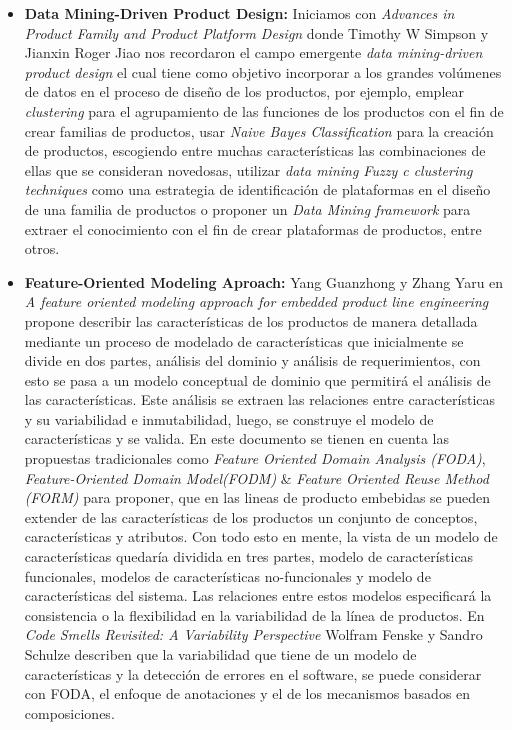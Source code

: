 \begin{itemize}
	\item{ \textbf{Data Mining-Driven Product Design:}}
	Iniciamos con \textit{Advances in Product Family and Product Platform Design}\cite{Simpson} donde Timothy W Simpson y Jianxin Roger Jiao nos recordaron el campo emergente \textit{data mining-driven product design} el cual tiene como objetivo incorporar a los grandes volúmenes de datos en el proceso de diseño de los productos, por ejemplo, emplear \textit{clustering} para el agrupamiento de las funciones de los productos con el fin de crear familias de productos, usar \textit{Naive Bayes Classification} para la creación de productos, escogiendo entre muchas características las combinaciones de ellas que se consideran  novedosas, utilizar \textit{data mining Fuzzy c clustering techniques} como una estrategia de identificación de plataformas en el diseño de una familia de productos o proponer un \textit{Data Mining framework} para extraer el conocimiento con el fin de crear plataformas de productos, entre otros. 
	\item{ \textbf{Feature-Oriented Modeling Aproach:}} 
	Yang Guanzhong y Zhang Yaru en \textit{A feature oriented modeling approach for embedded product line engineering}\cite{Yang2015a} propone describir las características de los productos de manera detallada mediante un proceso de modelado de características que inicialmente se divide en dos partes, análisis del dominio y análisis de requerimientos, con esto se pasa a un modelo conceptual de dominio que permitirá el análisis de las características. Este análisis se extraen las relaciones entre características y su variabilidad e inmutabilidad, luego, se construye el modelo de características y se valida. En este documento se tienen en cuenta las propuestas tradicionales como \textit{Feature Oriented Domain Analysis (FODA)}, \textit{Feature-Oriented Domain Model(FODM)} \& \textit{Feature  Oriented Reuse Method (FORM)} para proponer, que en las lineas de producto embebidas se pueden extender de las características de los productos un conjunto de conceptos, características y atributos. Con todo esto en mente, la vista de un modelo de características quedaría dividida en tres partes, modelo de características funcionales, modelos de características no-funcionales y modelo de características del sistema. Las relaciones entre estos modelos especificará la consistencia o la flexibilidad en la variabilidad de la línea de productos.
	En \textit{Code Smells Revisited: A Variability Perspective}\cite{Fenske2015} Wolfram Fenske y Sandro Schulze describen que la variabilidad que tiene de un modelo de características y la detección de errores en el software, se puede considerar con FODA, el enfoque de anotaciones y el de los mecanismos basados en composiciones.

\end{itemize}
